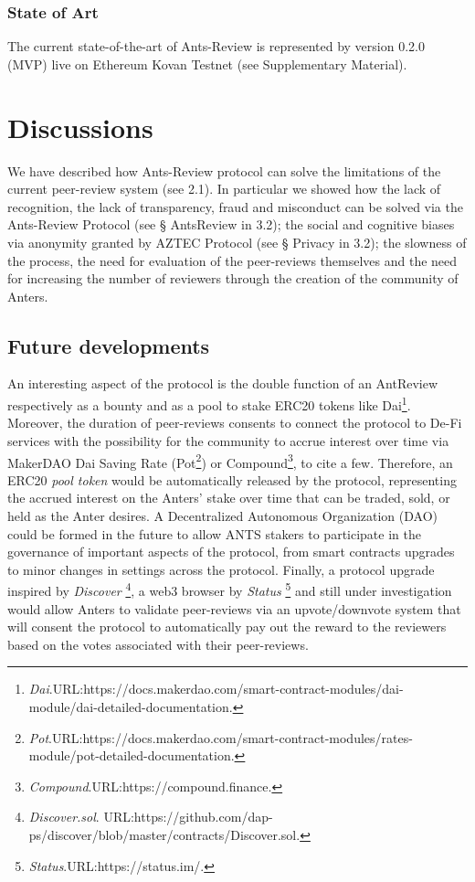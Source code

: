 \documentclass[runningheads]{llncs}
\begin{document}
\subsubsection{State of Art} The current state-of-the-art of Ants-Review is represented by version 0.2.0 (MVP) live on Ethereum Kovan Testnet (see Supplementary Material).

\section{Discussions}
We have described how Ants-Review protocol can solve the limitations of the current peer-review system (see 2.1). In particular we showed how the lack of recognition, the lack of transparency, fraud and misconduct can be solved via the Ants-Review Protocol (see § AntsReview in 3.2); the social and cognitive biases via anonymity granted by AZTEC Protocol (see § Privacy in 3.2); the slowness of the process, the need for evaluation of the peer-reviews themselves and the need for increasing the number of reviewers through the creation of the community of Anters. 
\subsection{Future developments}
An interesting aspect of the protocol is the double function of an AntReview respectively as a bounty and as a pool to stake ERC20 tokens like Dai\footnote[14]{\emph{Dai}.\textsc{URL:}https://docs.makerdao.com/smart-contract-modules/dai-module/dai-detailed-documentation.}. Moreover, the duration of peer-reviews consents to connect the protocol to De-Fi services with the possibility for the community to accrue interest over time via MakerDAO Dai Saving Rate (Pot\footnote[16]{\emph{Pot}.\textsc{URL:}https://docs.makerdao.com/smart-contract-modules/rates-module/pot-detailed-documentation.}) or Compound\footnote[17]{\emph{Compound}.\textsc{URL:}https://compound.finance.}, to cite a few.
Therefore, an ERC20 \emph{pool token} would be automatically released by the protocol, representing the accrued interest on the Anters' stake over time that can be traded, sold, or held as the Anter desires.
A Decentralized Autonomous Organization (DAO) \cite{Wang-DAO,DAOContr} could be formed in the future to allow ANTS stakers to participate in the governance of important aspects of the protocol, from smart contracts upgrades to minor changes in settings across the protocol.
\newline Finally, a protocol upgrade inspired by \emph{Discover} \footnote[18]{\emph{Discover.sol}. \textsc{URL:}\newline https://github.com/dap-ps/discover/blob/master/contracts/Discover.sol.}, a web3 browser by \emph{Status} \footnote[19]{\emph{Status}.\textsc{URL:}https://status.im/.} and still under investigation would allow Anters to validate peer-reviews via an upvote/downvote system that will consent the protocol to automatically pay out the reward to the reviewers based on the votes associated with their peer-reviews.
\end{document}
